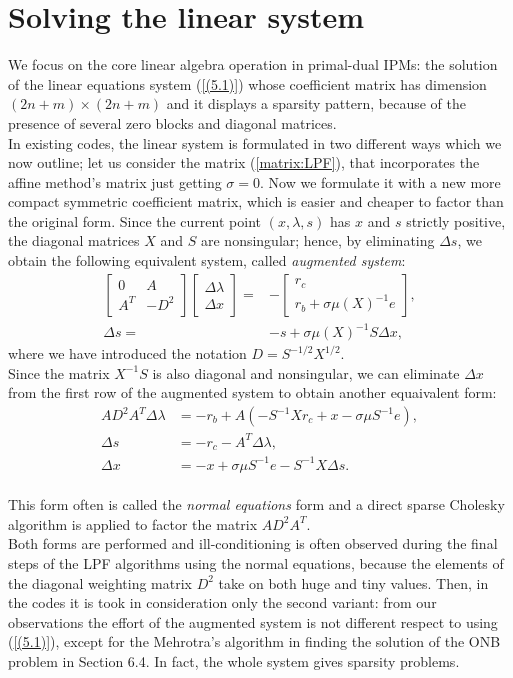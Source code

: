 \documentclass[a4paper,10 pt,titlepage,twoside]{book}
\theoremstyle{plain}
\theoremstyle{definition}
\theoremstyle{remark}
\begin{document}
{{\section*{Solving the linear system}
We focus on the core linear algebra operation in primal-dual IPMs: the solution of the linear equations system (\ref{(5.1)})
whose coefficient matrix has dimension $(2n+m)\times(2n+m)$ and it displays a sparsity pattern, because of the presence of several zero blocks and diagonal matrices.\\In existing codes, the linear
system is formulated in two different ways which we now outline; let us consider the matrix (\ref{matrix:LPF}), that incorporates the affine method's matrix just getting $\sigma=0$.
Now we formulate it with a new more compact symmetric coefficient matrix, which
is easier and cheaper to factor than the original form. Since the current point $(x, \lambda, s)$ has $x$ and $s$ strictly
positive, the diagonal matrices $X$ and $S$ are nonsingular; hence, by eliminating $\Delta s$, we obtain the following equivalent system, called \textit{augmented system}:
\begin{align*}
\begin{bmatrix}
0&A\\A^{T}&-D^{2}
\end{bmatrix}\begin{bmatrix}
\Delta\lambda \\\Delta x
\end{bmatrix}=&-\begin{bmatrix}
r_{c}\\r_{b} + \sigma\mu(X)^{-1}e
\end{bmatrix},\\
\Delta s =& -s +\sigma\mu (X)^{-1}S\Delta x,
\end{align*}
where we have introduced the notation $D = S^{-1/2}X^{1/2}$.\\
Since the matrix $X^{-1}S$ is also diagonal and nonsingular, we can eliminate $\Delta x$ from the first row of the augmented system to obtain another equaivalent form:
\begin{align*}
AD^{2}A^{T}\Delta\lambda &= -r_{b}+A(-S^{-1}Xr_{c}+ x - \sigma\mu S^{-1}e),\\
\Delta s &= -r_{c}-A^{T}\Delta \lambda,\\
\Delta x &= -x + \sigma \mu S^{-1}e-S^{-1}X\Delta s.
\end{align*}
\\
This form often is called the \textit{normal equations} form and a direct sparse Cholesky algorithm is applied to factor the matrix $AD^{2}A^{T}$. \\Both forms are performed and ill-conditioning is often observed during the final steps of the LPF algorithms using the normal equations, because the elements of the diagonal weighting
matrix $D^{2}$ take on both huge and tiny values.
Then, in the codes it is took in consideration only the second variant: from our observations the effort of the augmented system is not different respect to using (\ref{(5.1)}), except for the Mehrotra's algorithm in finding the solution of the ONB problem in Section 6.4. In fact, the whole system gives sparsity problems. 
}}
\end{document}
